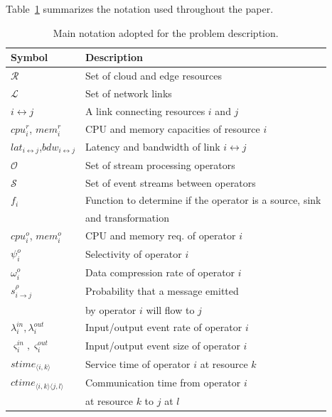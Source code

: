 Table~\ref{tab:symbology} summarizes the notation used throughout the paper.
\begin{table}[ht]
  \caption{Main notation adopted for the problem description.}
  \label{tab:symbology}
  \begin{tabular}{ll}
    \toprule
    Symbol & Description\\
    \midrule
    $\mathcal{R}$ & Set of cloud and edge resources\\
    $\mathcal{L}$ & Set of network links\\
    $i\!\leftrightarrow\!j$ & A link connecting resources $i$ and $j$ \\
    $cpu^r_i$, $mem^r_i$ & CPU and memory capacities of resource $i$ \\
    $lat_{i\!\leftrightarrow\!j}$,$bdw_{i\!\leftrightarrow\!j}$ & Latency and bandwidth of link $i\!\leftrightarrow\!j$ \\
    $\mathcal{O}$ & Set of stream processing operators \\
    $\mathcal{S}$ & Set of event streams between operators \\
    $f_i$ & Function to determine if the operator is a source, sink \\
    & and transformation\\
    $cpu^o_i$, $mem^o_i$ & CPU and memory req. of operator $i$\\
    $\psi^o_i$ & Selectivity of operator $i$\\
    $\omega^o_i$ & Data compression rate of operator $i$\\
    $s^{\rho}_{i\rightarrow j}$ & Probability that a message emitted\\ 
    &  by operator $i$ will flow to $j$\\ 
    $\lambda_i^{in},\lambda_i^{out}$ & Input/output event rate of operator $i$\\
    $\varsigma_i^{in},\varsigma_i^{out}$ & Input/output event size of operator $i$\\
    $stime_{\langle i,k\rangle}$ & Service time of operator $i$ at resource $k$\\
    $ctime_{\langle i,k\rangle\langle j,l\rangle}$ & Communication time from operator $i$ \\ 
    & at resource $k$ to $j$ at $l$ \\

\end{tabular}
\end{table}
